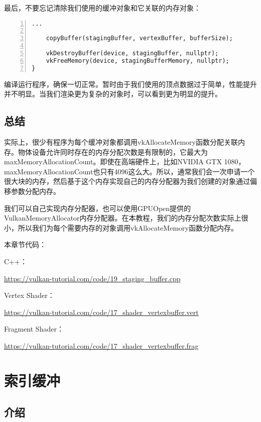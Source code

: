 \documentclass{ctexart}
\begin{document}
最后，不要忘记清除我们使用的缓冲对象和它关联的内存对象：

\begin{lstlisting}[language={[ANSI]C},keywordstyle=\color{blue!70},commentstyle=\color{red!50!green!50!blue!50},frame=shadowbox, rulesepcolor=\color{red!20!green!20!blue!20},basicstyle=\small,numbers=left, numberstyle=\tiny,breaklines=true]
		...

	copyBuffer(stagingBuffer, vertexBuffer, bufferSize);

	vkDestroyBuffer(device, stagingBuffer, nullptr);
	vkFreeMemory(device, stagingBufferMemory, nullptr);
}
\end{lstlisting}

编译运行程序，确保一切正常。暂时由于我们使用的顶点数据过于简单，性能提升并不明显。当我们渲染更为复杂的对象时，可以看到更为明显的提升。

\subsection{总结}

实际上，很少有程序为每个缓冲对象都调用vkAllocateMemory函数分配关联内存。物体设备允许同时存在的内存分配次数是有限制的，它最大为maxMemoryAllocationCount。即使在高端硬件上，比如NVIDIA GTX 1080，maxMemoryAllocationCount也只有4096这么大。所以，通常我们会一次申请一个很大块的内存，然后基于这个内存实现自己的内存分配器为我们创建的对象通过偏移参数分配内存。

我们可以自己实现内存分配器，也可以使用GPUOpen提供的VulkanMemoryAllocator内存分配器。在本教程，我们的内存分配次数实际上很小，所以我们为每个需要内存的对象调用vkAllocateMemory函数分配内存。

本章节代码：

C++：

\url{https://vulkan-tutorial.com/code/19_staging_buffer.cpp}

Vertex Shader：

\url{https://vulkan-tutorial.com/code/17_shader_vertexbuffer.vert}

Fragment Shader：

\url{https://vulkan-tutorial.com/code/17_shader_vertexbuffer.frag}

\newpage
\section{索引缓冲}

\subsection{介绍}
\end{document}
